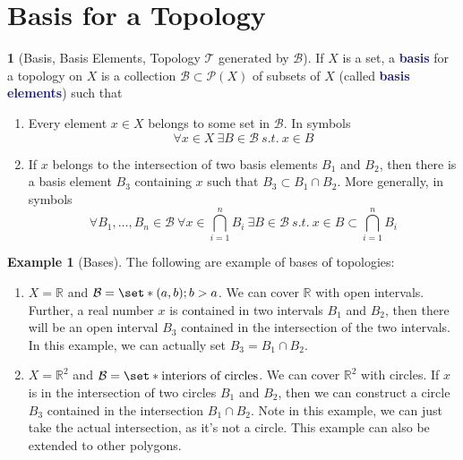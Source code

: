 \documentclass[11pt]{article}
\numberwithin{equation}{section}
\newcommand{\navy}[1]{\textcolor{MidnightBlue}{\bf #1}}
\theoremstyle{plain}
\theoremstyle{definition}
\newtheorem{definition}{\color{MidnightBlue}{\textbf{Definition}}}[section]
\newtheorem{example}{\color{WildStrawberry}Example}[section]
\def\Set{\set*}%
\def\ss{\subset}
\newcommand{\1}{\mathbbm 1}
\newcommand{\RR}{\mathbb R}
\newcommand{\pP}{\mathcal P}
\newcommand{\tT}{\mathcal T}
\newcommand{\bB}{\mathcal B}
\begin{document}
\section{Basis for a Topology}

\begin{definition}[Basis, Basis Elements, Topology $\tT$ generated by $\bB$]
	If $X$ is a set, a \navy{basis} for a topology on $X$ is a collection $\bB \ss \pP(X)$ of subsets of $X$ (called \navy{basis elements}) such that
	\begin{enumerate}
		\item Every element $x \in X$ belongs to some set in $\bB$. In symbols
		\begin{equation}
			\forall x \in X \ \exists B \in \bB \ s.t. \ x \in B
		\end{equation}
		\item If $x$ belongs to the intersection of two basis elements $B_1$ and $B_2$, then there is a basis element $B_3$ containing $x$ such that $B_3 \subset B_1 \cap B_2$. More generally, in symbols
		\begin{equation}
			\forall B_1,\ldots,B_n \in \bB \ \forall x \in \bigcap_{i=1}^n B_i \ \exists B \in \bB \ s.t. \ x \in B \ss \bigcap_{i=1}^n B_i 
		\end{equation}
	\end{enumerate}
\end{definition}

\begin{example}[Bases] The following are example of bases of topologies:
	\begin{enumerate}
		\item $X = \RR$ and $\bB = \Set{(a,b);b>a}$. We can cover $\RR$ with open intervals. Further, a real number $x$ is contained in two intervals $B_1$ and $B_2$, then there will be an open interval $B_3$ contained in the intersection of the two intervals. In this example, we can actually set $B_3 = B_1 \cap B_2$. 
		\item $X = \RR^2$ and $\bB = \Set{\text{interiors of circles}}$. We can cover $\RR^2$ with circles. If $x$ is in the intersection of two circles $B_1$ and $B_2$, then we can construct a circle $B_3$ contained in the intersection $B_1 \cap B_2$. Note in this example, we can just take the actual intersection, as it's not a circle. This example can also be extended to other polygons. 
	\end{enumerate}
\end{example}
\end{document}

